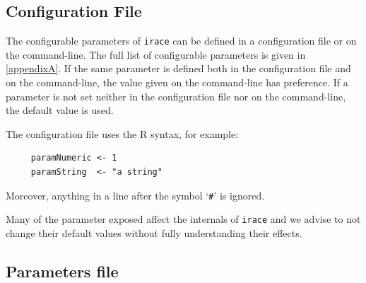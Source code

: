 \documentclass[a4paper]{article}
\newcommand{\irace}{\texttt{irace}\xspace}
\newcommand{\aR}{\textsf{R}\xspace}
\begin{document}
\subsection{Configuration File}\label{sec:configFile}
 
The configurable parameters of \irace can be defined in a
configuration file or on the command-line. The full list of
configurable parameters is given in
\autoref{appendixA}. If the same parameter is defined
both in the configuration file and on the command-line, the value
given on the command-line has preference. If a parameter is not set
neither in the configuration file nor on the command-line, the default
value is used.

The configuration file uses the \aR syntax, for example:
%
\begin{verbatim}
     paramNumeric <- 1
     paramString  <- "a string"
\end{verbatim}
%
Moreover, anything in a line after the symbol `\texttt{\#}' is ignored.

Many of the parameter exposed affect the internals of \irace and we
advise to not change their default values without fully understanding
their effects.




\subsection{Parameters file}\label{sec:paramFile}
\end{document}
